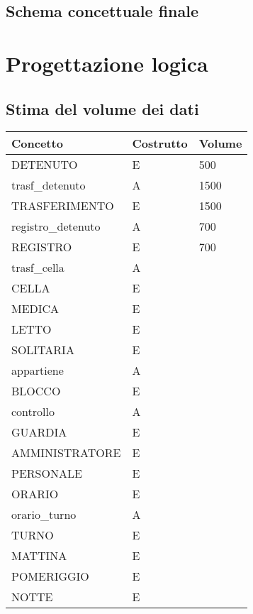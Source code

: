 \documentclass[a4paper,12pt]{report}
\begin{document}
\section{Schema concettuale finale}
\chapter{Progettazione logica}
\section{Stima del volume dei dati}
\begin{table}[H]
\begin{tabular}{lll}
\hline
Concetto & Costrutto & Volume \\ \hline
DETENUTO & E & 500 \\
trasf\_detenuto & A & 1500 \\
TRASFERIMENTO & E &  1500 \\
registro\_detenuto & A & 700 \\
REGISTRO & E & 700 \\
trasf\_cella & A &  \\
CELLA & E &  \\
MEDICA & E & \\
LETTO & E & \\
SOLITARIA & E & \\
appartiene & A & \\
BLOCCO & E & \\
controllo & A & \\
GUARDIA & E & \\
AMMINISTRATORE & E & \\
PERSONALE & E & \\
ORARIO & E & \\
orario\_turno & A & \\
TURNO & E & \\
MATTINA & E & \\
POMERIGGIO & E & \\
NOTTE & E &
\end{tabular}
\end{table}
\end{document}
